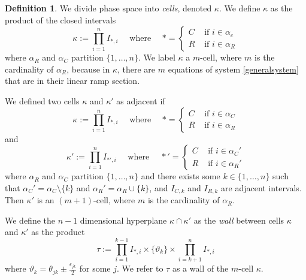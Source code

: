 \documentclass[12pt]{article}
\theoremstyle{definition}
\newtheorem{defn}{Definition}[section]
\theoremstyle{remark}
\begin{document}
\begin{defn} \label{kappa}
 We divide phase space into \textit{cells}, denoted $\kappa$. We define $\kappa$ as the product of the closed intervals
 \begin{equation}	\label{kappadefn}
 \kappa:=\prod_{i=1}^n I_{*,i} \quad \text{ where } \quad *=
 \begin{cases} 
 C & \text { if } i\in\alpha_c \\
 R & \text{ if } i \in \alpha_R
 \end{cases}
 \end{equation}
 where $\alpha_R$ and $\alpha_C$ partition $\{1,\dots,n\}$. We label $\kappa$ a  $m$-cell, where $m$ is the cardinality of $\alpha_R$, because in $\kappa$, there are $m$ equations of system \eqref{generalsystem} that are in their linear ramp section.

We defined two cells $\kappa$ and $\kappa'$ as adjacent if 
\begin{equation*}
\kappa:=\prod_{i=1}^n I_{*,i} \quad \text{ where } \quad *=
 \begin{cases} 
 C & \text { if } i\in\alpha_C \\
 R & \text{ if } i \in \alpha_R
 \end{cases}
 \end{equation*}
 and 
 \begin{equation*}
\kappa':=\prod_{i=1}^n I_{*',i} \quad \text{ where } \quad *'=
 \begin{cases} 
 C & \text { if } i\in\alpha_C' \\
 R & \text{ if } i \in \alpha_R'
 \end{cases}
 \end{equation*}
 where $\alpha_R$ and $\alpha_C$ partition $\{1,\dots,n\}$ and there exists some $k\in \{1,\dots,n\}$ such that $\alpha_C'=\alpha_C\setminus \{k\}$ and $\alpha_R'=\alpha_R\cup \{k\}$, and $I_{C,k}$ and $I_{R,k}$ are adjacent intervals. Then $\kappa'$ is an $(m+1)$-cell, where $m$ is the cardinality of $\alpha_R$.
 
We define the $n-1$ dimensional hyperplane $\kappa \cap \kappa'$ as the \textit{wall} between cells $\kappa$ and $\kappa'$ as the product
\begin{equation*}
\tau:=\prod_{i=1}^{k-1} I_{*,i} \times \{\vartheta_k\} \times \prod_{i=k+1}^{n} I_{*,i}
\end{equation*}
where $\vartheta_k = \theta_{jk} \pm \frac{\epsilon_{jk}}{2}$ for some $j$. We refer to $\tau$ as a wall of the $m$-cell $\kappa$.
\end{defn}
\end{document}
